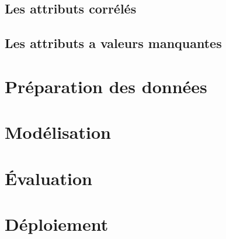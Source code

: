 \subsection{Les attributs corrélés}

\subsection{Les attributs a valeurs manquantes}
\section{Préparation des données}
\section{Modélisation}
\section{Évaluation}
\section{Déploiement}